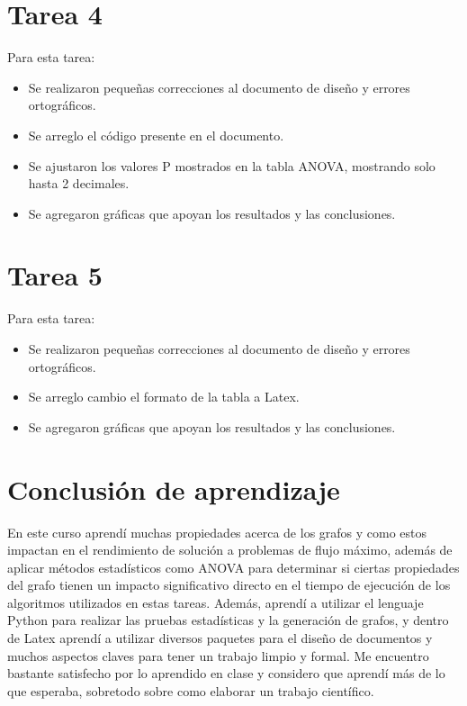 \documentclass[12pt]{article}
\begin{document}
\section{Tarea 4}
Para esta tarea:
\begin{itemize}
    \item Se realizaron pequeñas correcciones al documento de diseño y errores ortográficos.
    \item Se arreglo el código presente en el documento.
    \item Se ajustaron los valores P mostrados en la tabla ANOVA, mostrando solo hasta 2 decimales.
    \item Se agregaron gráficas que apoyan los resultados y las conclusiones.
\end{itemize}



\section{Tarea 5}
Para esta tarea:
\begin{itemize}
    \item Se realizaron pequeñas correcciones al documento de diseño y errores ortográficos.
    \item Se arreglo cambio el formato de la tabla a Latex.
    \item Se agregaron gráficas que apoyan los resultados y las conclusiones.
\end{itemize}



\section{Conclusión de aprendizaje}
En este curso aprendí muchas propiedades acerca de los grafos y como estos impactan en el rendimiento de solución a problemas de flujo máximo, además de aplicar métodos estadísticos como ANOVA para determinar si ciertas propiedades del grafo tienen un impacto significativo directo en el tiempo de ejecución de los algoritmos utilizados en estas tareas.
Además, aprendí a utilizar el lenguaje Python para realizar las pruebas estadísticas y la generación de grafos, y dentro de Latex aprendí a utilizar diversos paquetes para el diseño de documentos y muchos aspectos claves para tener un trabajo limpio y formal. Me encuentro bastante satisfecho por lo aprendido en clase y considero que aprendí más de lo que esperaba, sobretodo sobre como elaborar un trabajo científico.



\end{document}
